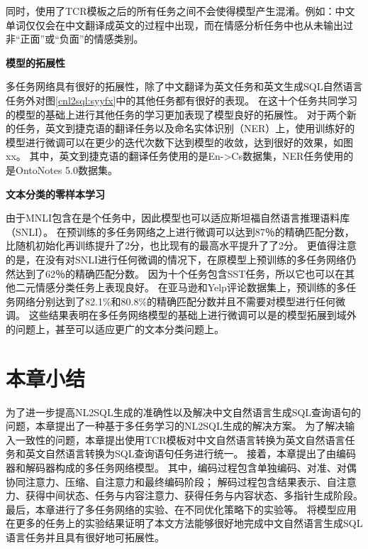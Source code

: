 同时，使用了TCR模板之后的所有任务之间不会使得模型产生混淆。例如：中文单词仅仅会在中文翻译成英文的过程中出现，而在情感分析任务中也从未输出过非“正面”或“负面”的情感类别。

\textbf{模型的拓展性}

多任务网络具有很好的拓展性，除了中文翻译为英文任务和英文生成SQL自然语言任务外对图\ref{cnl2sql:syyfx}中的其他任务都有很好的表现。
在这十个任务共同学习的模型的基础上进行其他任务的学习更加表现了模型良好的拓展性。
对于两个新的任务，英文到捷克语的翻译任务以及命名实体识别（NER）上，使用训练好的模型进行微调可以在更少的迭代次数下达到模型的收敛，达到很好的效果，如图xx。
其中，英文到捷克语的翻译任务使用的是En->Cs数据集，NER任务使用的是OntoNotes 5.0数据集\cite{Hovy2006OntoNotes}。

\textbf{文本分类的零样本学习}

由于MNLI包含在是个任务中，因此模型也可以适应斯坦福自然语言推理语料库（SNLI）\cite{Bowman2015A}。
在预训练的多任务网络之上进行微调可以达到87％的精确匹配分数，比随机初始化再训练提升了2分，也比现有的最高水平提升了了2分\cite{Kim2018Semantic}。
更值得注意的是，在没有对SNLI进行任何微调的情况下，在原模型上预训练的多任务网络仍然达到了62％的精确匹配分数。
因为十个任务包含SST任务，所以它也可以在其他二元情感分类任务上表现良好。 
在亚马逊和Yelp评论数据集\cite{Kotzias2015From}上，预训练的多任务网络分别达到了82.1\%和80.8\%的精确匹配分数并且不需要对模型进行任何微调。
这些结果表明在多任务网络模型的基础上进行微调可以是的模型拓展到域外的问题上，甚至可以适应更广的文本分类问题上。

\section{本章小结}

为了进一步提高NL2SQL生成的准确性以及解决中文自然语言生成SQL查询语句的问题，本章提出了一种基于多任务学习的NL2SQL生成的解决方案。
为了解决输入一致性的问题，本章提出使用TCR模板对中文自然语言转换为英文自然语言任务和英文自然语言转换为SQL查询语句任务进行统一。
接着，本章提出了由编码器和解码器构成的多任务网络模型。
其中，编码过程包含单独编码、对准、对偶协同注意力、压缩、自注意力和最终编码阶段；
解码过程包含结果表示、自注意力、获得中间状态、任务与内容注意力、获得任务与内容状态、多指针生成阶段。
最后，本章进行了多任务网络的实验、在不同优化策略下的实验等。
将模型应用在更多的任务上的实验结果证明了本文方法能够很好地完成中文自然语言生成SQL语言任务并且具有很好地可拓展性。
